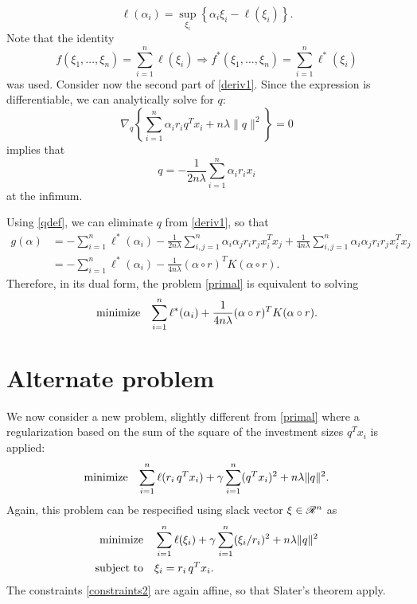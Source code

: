 \documentclass{article}
\newcommand{\sumi}{\sum_{i=1}^n}
\newcommand{\sumij}{\sum_{i,j=1}^n}
\begin{document}
\begin{equation}
  \ell(\alpha_i) = \sup_{\xi_i}\left\{\alpha_i\xi_i - \ell(\xi_i)\right\}.
\end{equation}
Note that the identity
\begin{equation}
  \label{lemma1}
  f(\xi_1,\dots,\xi_n) = \sumi \ell(\xi_i) \Longrightarrow f^*(\xi_1,\dots,\xi_n) = \sumi \ell^*(\xi_i)
\end{equation}
was used. Consider now the second part of \eqref{deriv1}. Since
the expression is differentiable, we can analytically solve for $q$:
\begin{equation}
  \nabla_q \left\{\sumi \alpha_ir_iq^Tx_i + n\lambda\|q\|^2\right\} = 0
\end{equation}
implies that
\begin{equation}
 q = -\frac{1}{2n\lambda}\sumi \alpha_ir_ix_i \label{qdef}
\end{equation}
at the infimum.

Using \eqref{qdef}, we can eliminate $q$ from \eqref{deriv1}, so that
\begin{align}
  g(\alpha) &= -\sumi \ell^*(\alpha_i) - \frac{1}{2n\lambda}\sumij \alpha_i\alpha_jr_ir_jx_i^Tx_j + \frac{1}{4n\lambda}
         \sumij \alpha_i\alpha_jr_ir_jx_i^Tx_j\\
       &= -\sumi \ell^*(\alpha_i) - \frac{1}{4n\lambda}(\alpha \circ r)^TK(\alpha \circ r). 
\end{align}
Therefore, in its dual form, the problem \eqref{primal} is equivalent to solving
\begin{equation}
  \minimizeEquation{\sumi \ell^*(\alpha_i) + \frac{1}{4n\lambda}(\alpha \circ r)^TK(\alpha \circ r).}
\end{equation}

\section{Alternate problem}

We now consider a new problem, slightly different from \eqref{primal} where a
regularization based on the sum of the square of the investment sizes $q^Tx_i$ is applied:
\begin{equation}
  \label{primal2000}
  \minimizeEquation{\sumi \ell(r_i\,q^Tx_i) + \gamma\sumi(q^Tx_i)^2 + n\lambda\|q\|^2}.
\end{equation}
Again, this problem can be respecified using slack vector $\xi \in \mathscr{R}^n$ as
\begin{align}
  \minimizeEquationSt{\label{primal2001}\sumi \ell(\xi_i) + \gamma\sumi(\xi_i/r_i)^2 + n\lambda\|q\|^2}[\label{constraints2}\xi_i = r_i\,q^Tx_i].
\end{align}
The constraints \eqref{constraints2} are again affine, so that Slater's theorem apply.
\end{document}
